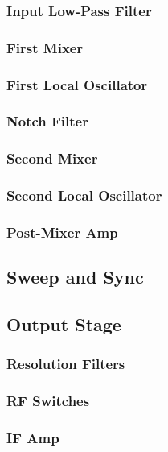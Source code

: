 \subsubsection{Input Low-Pass Filter}

\subsubsection{First Mixer}

\subsubsection{First Local Oscillator}

\subsubsection{Notch Filter}

\subsubsection{Second Mixer}

\subsubsection{Second Local Oscillator}

\subsubsection{Post-Mixer Amp}

\subsection{Sweep and Sync}

\subsection{Output Stage}

\subsubsection{Resolution Filters}

\subsubsection{RF Switches}

\subsubsection{IF Amp}

